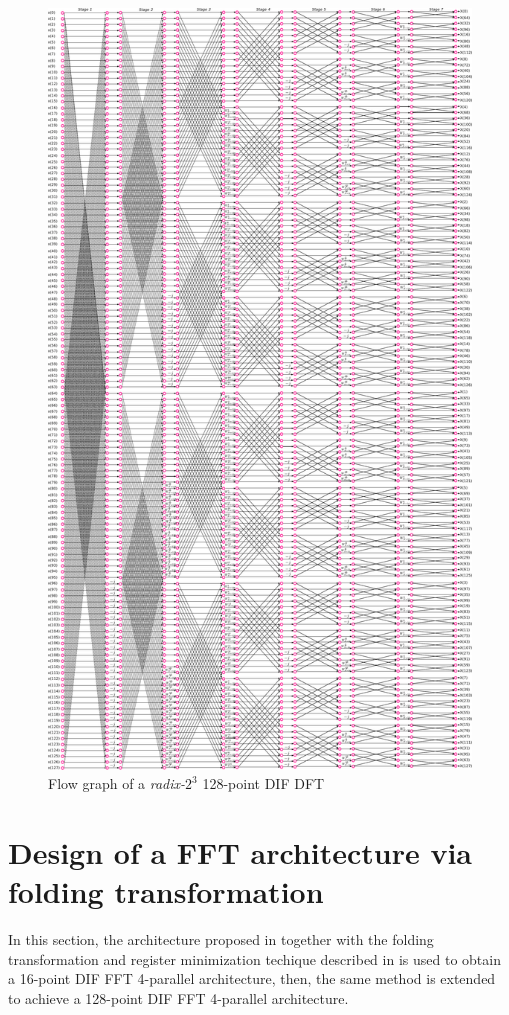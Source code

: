 \documentclass[10pt,times,mathptm,psfig,final,journal,comsoc]{IEEEtran}
\begin{document}
\begin{figure} 
	\centering
	\includegraphics[width=\linewidth]{Diagramas/miSeccionFiguras/128PuntosRadix8Conexion.pdf}
	\caption{Flow graph of a \textit{radix-}$2^3$ 128-point DIF DFT}
	\label{fig:128points_conn}
\end{figure}



\section{Design of a FFT architecture via folding transformation} \label{sec:16points}
In this section, the architecture proposed in \cite{ayinala_pipelined_2012} together with the folding transformation and register minimization techique described in \cite{folding_parhi_book} is used to obtain a 16-point DIF FFT 4-parallel architecture, then, the same method is extended  to achieve a 128-point DIF FFT 4-parallel architecture.
\end{document}
